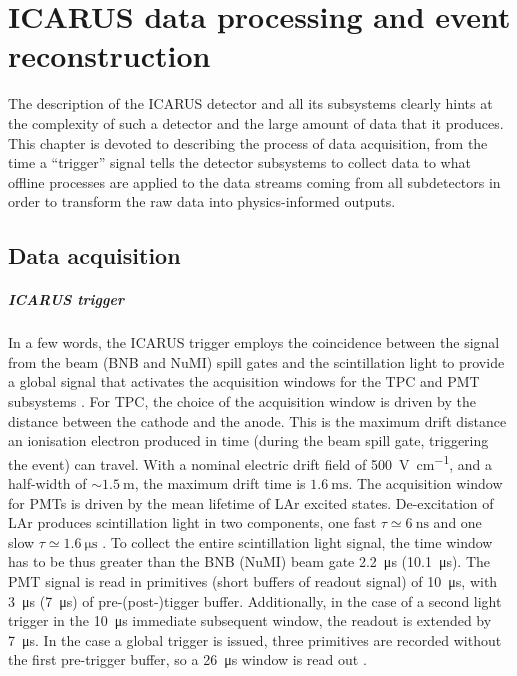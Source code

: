 
\chapter{ICARUS data processing and event reconstruction}
\label{chap:event_reconstruction}

The description of the ICARUS detector and all its subsystems clearly hints at the complexity of such a detector and the large amount of data that it produces. This chapter is devoted to describing the process of data acquisition, from the time a ``trigger'' signal tells the detector subsystems to collect data to what offline processes are applied to the data streams coming from all subdetectors in order to transform the raw data into physics-informed outputs. 

\section{Data acquisition} \label{sec:DAQ}

\paragraph{ICARUS trigger} In a few words, the ICARUS trigger employs the coincidence between the signal from the beam (BNB and NuMI) spill gates and the scintillation light to provide a global signal that activates  the acquisition windows for the TPC and PMT subsystems \cite{ICARUS:2025kai}. For TPC, the choice of the acquisition window is driven by the distance between the cathode and the anode. This is the maximum drift distance an ionisation electron produced in time (during the beam spill gate, triggering the event) can travel. With a nominal electric drift field of \SI{500}{\volt\per\cm}, and a half-width of $\sim\SI{1.5}{\m}$, the maximum drift time is $\SI{1.6}{\ms}$. The acquisition window for PMTs is driven by the mean lifetime of LAr excited states. De-excitation of LAr produces scintillation light in two components, one fast $\tau\simeq \SI{6}{\ns}$ and one slow $\tau\simeq\SI{1.6}{\us}$ \cite{Segreto:2020qks}. To collect the entire scintillation light signal, the time window has to be thus greater than the BNB (NuMI) beam gate \SI{2.2}{\us} (\SI{10.1}{\us}). The PMT signal is read in primitives (short buffers of readout signal) of \SI{10}{\us}, with \SI{3}{\us} (\SI{7}{\us}) of pre-(post-)tigger buffer.  Additionally, in the case of a second light trigger in the \SI{10}{\us} immediate subsequent window, the readout is extended by \SI{7}{\us}. In the case a global trigger is issued, three primitives are recorded without the first pre-trigger buffer, so a \SI{26}{\us} window is read out \cite{ICARUS:2025kai}. 

